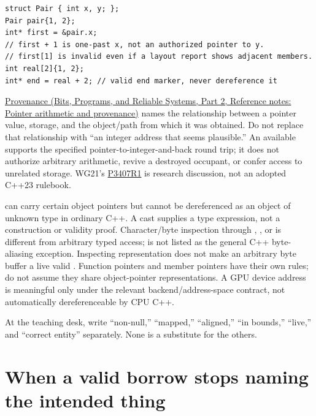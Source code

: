\begin{verbatim}
struct Pair { int x, y; };
Pair pair{1, 2};
int* first = &pair.x;
// first + 1 is one-past x, not an authorized pointer to y.
// first[1] is invalid even if a layout report shows adjacent members.
int real[2]{1, 2};
int* end = real + 2; // valid end marker, never dereference it
\end{verbatim}

\href{../01-Bits-Programs-and-Reliable-Systems-P02/main.pdf\#appendix-6af5921bc853}{Provenance (Bits, Programs, and Reliable Systems, Part 2, Reference notes: Pointer arithmetic and provenance)} names the relationship between a pointer value, storage, and the object/path from which it was obtained. Do not replace that relationship with ``an integer address that seems plausible.'' An available  supports the specified pointer-to-integer-and-back round trip; it does not authorize arbitrary arithmetic, revive a destroyed occupant, or confer access to unrelated storage. WG21's \href{https://www.open-std.org/jtc1/sc22/wg21/docs/papers/2025/p3407r1.html}{P3407R1} is research discussion, not an adopted C++23 rulebook.

 can carry certain object pointers but cannot be dereferenced as an object of unknown type in ordinary C++. A cast supplies a type expression, not a construction or validity proof. Character/byte inspection through , , or  is different from arbitrary typed access;  is not listed as the general C++ byte-aliasing exception. Inspecting representation does not make an arbitrary byte buffer a live valid . Function pointers and member pointers have their own rules; do not assume they share object-pointer representations. A GPU device address is meaningful only under the relevant backend/address-space contract, not automatically dereferenceable by CPU C++.

At the teaching desk, write ``non-null,'' ``mapped,'' ``aligned,'' ``in bounds,'' ``live,'' and ``correct entity'' separately. None is a substitute for the others.

\section{When a valid borrow stops naming the intended thing}\label{05-engine-i-ch003-when-a-valid-borrow-stops-naming-the-intended-thing}

